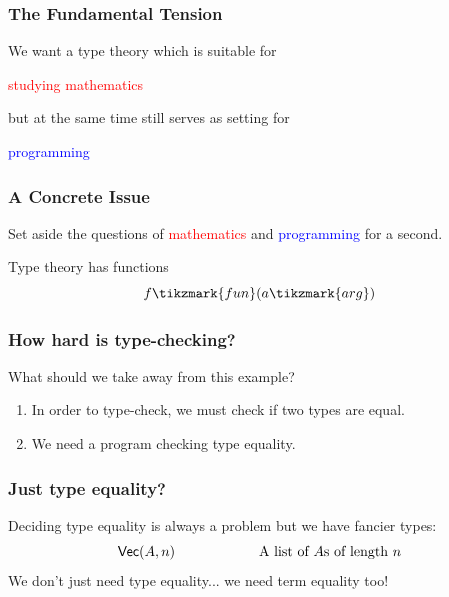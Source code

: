 \documentclass[usenames,dvipsnames,aspectratio=169,12pt]{beamer}
\begin{document}
\begin{frame}
  \frametitle{The Fundamental Tension}

  We want a type theory which is suitable for

  \begin{center}
    \textcolor{Red}{studying mathematics}
  \end{center}

  but at the same time still serves as setting for

  \begin{center}
    \textcolor{Blue}{programming}
  \end{center}

\end{frame}

\begin{frame}
  \frametitle{A Concrete Issue}
  Set aside the questions of \textcolor{Red}{mathematics} and \textcolor{Blue}{programming} for a
  second.
  \bigskip

  Type theory has functions
  \[
    \App{f\tikzmark{fun}}{a\tikzmark{arg}}
  \]
\end{frame}

\begin{frame}
  \frametitle{How hard is type-checking?}
  What should we take away from this example?
  \begin{enumerate}
  \item In order to type-check, we must check if two types are equal.
  \item We need a program checking type equality.
  \end{enumerate}
\end{frame}

\begin{frame}
  \frametitle{Just type equality?}
  Deciding type equality is always a problem but we have fancier types:
  \[
    \mathsf{Vec}(A, n) \qquad\quad\qquad\quad\text{A list of $A$s of length $n$}
  \]
  \pause
  We don't just need type equality... we need term equality too!
\end{frame}
\end{document}
